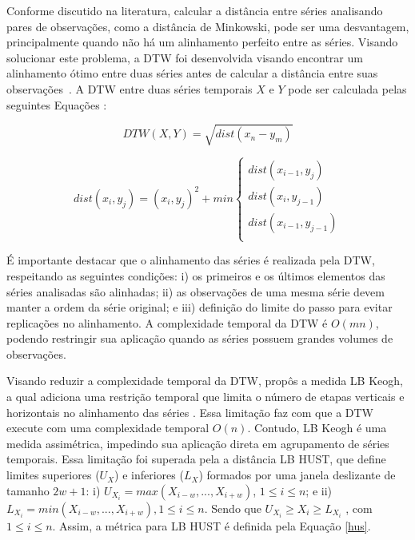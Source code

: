Conforme discutido na literatura, calcular a distância entre séries analisando pares de observações, como a distância de Minkowski, pode ser uma desvantagem, principalmente quando não há um alinhamento perfeito entre as séries. Visando solucionar este problema, a DTW foi desenvolvida visando encontrar um alinhamento ótimo entre duas séries antes de calcular a distância entre suas observações~\cite{Meesrikamolkul2012,Chen2004,Esling2012,Liao2005,Mori2016}. A \ac{DTW} entre duas séries temporais $X$ e $Y$ pode ser calculada pelas seguintes Equações :

\begin{equation}\label{dtwww}
DTW(X,Y)=\sqrt{dist(x_{n}-y_{m})}
\end{equation}

\begin{equation}\label{dtww}
dist(x_{i},y_{j})=(x_{i},y_{j})^2+min 
  \begin{cases}
    dist(x_{i-1},y_{j})      \\
    dist(x_{i},y_{j-1})  \\
    dist(x_{i-1},y_{j-1}) \\
  \end{cases}
\end{equation}

É importante destacar que o alinhamento das séries é realizada pela DTW, respeitando as seguintes condições: i) os primeiros e os últimos elementos das séries analisadas são alinhadas; ii) as observações de uma mesma série devem manter a ordem da série original; e iii) definição do limite do passo para evitar replicações no alinhamento. A complexidade temporal da DTW é $O(mn)$, podendo restringir sua aplicação quando as séries possuem grandes volumes de observações.

Visando reduzir a complexidade temporal da DTW,  propôs a medida LB Keogh, a qual adiciona uma restrição temporal que limita o número de etapas verticais e horizontais no alinhamento das séries \cite{Esling2012}. Essa limitação faz com que a DTW execute com uma complexidade temporal $O(n)$. Contudo, LB Keogh é uma medida assimétrica, impedindo sua aplicação direta em agrupamento de séries temporais. Essa limitação foi superada pela a distância LB HUST, que define limites superiores ($U_X$) e inferiores ($L_X$) formados por uma janela deslizante de tamanho $2w+1$: i) $U_{X_{i}}= max(X_{i-w},...,X_{i+w})$,  $1 \leq i \leq n$; e ii) $L_{X_{i}} = min(X_{i-w},...,X_{i+w}), 1\leq i \leq n$. Sendo que $U_{X_{i}} \geq X_{i} \geq L_{X_{i}}$ , com $ 1 \leq i \leq n$. Assim, a métrica para LB HUST é definida pela Equação \ref{hus}.

